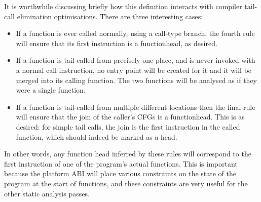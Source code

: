 It is worthwhile discussing briefly how this definition interacts with
compiler tail-call elimination optimisations.  There are three
interesting cases:

\begin{itemize}
\item
  If a function is ever called normally, using a call-type branch, the
  fourth rule will ensure that its first instruction is a
  \gls{functionhead}, as desired.
\item
  If a function is tail-called from precisely one place, and is never
  invoked with a normal call instruction, no entry point will be
  created for it and it will be merged into its calling function.  The
  two functions will be analysed as if they were a single function.
\item
  If a function is tail-called from multiple different locations then
  the final rule will ensure that the join of the caller's CFGs is a
  \gls{functionhead}.  This is as desired: for simple tail calls, the
  join is the first instruction in the called function, which should
  indeed be marked as a head.
\end{itemize}

In other words, any function head inferred by these rules will
correspond to the first instruction of one of the program's actual
functions.  This is important because the platform ABI will place
various constraints on the state of the program at the start of
functions, and these constraints are very useful for the other static
analysis passes.


